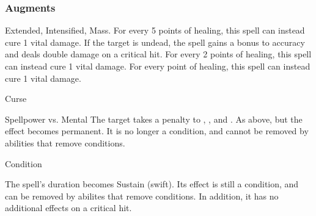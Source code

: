 \subsubsection{Augments}
 Extended, Intensified, Mass.
For every 5 points of healing, this spell can instead cure 1 vital damage.
If the target is undead, the spell gains a  bonus to accuracy and deals double damage on a critical hit.
For every 2 points of healing, this spell can instead cure 1 vital damage.
For every point of healing, this spell can instead cure 1 vital damage.
\begin{spellsection}{Curse}
\begin{spellheader}
\end{spellheader}
\begin{spellcontent}
\begin{spelltargetinginfo}
\end{spelltargetinginfo}
\begin{spelleffects}
\begin{spellattack}{Spellpower vs. Mental}
\spellsuccess
The target takes a  penalty to , , and .
\spellcritical
As above, but the effect becomes permanent.
It is no longer a condition, and cannot be removed by abilities that remove conditions.
\end{spellattack}
\spelldur Condition
\end{spelleffects}
\end{spellcontent}
\begin{spellfooter}
\spellnotes \cursespellnotes
\miscastexplode
\end{spellfooter}
\begin{spellcantrip}
The spell's duration becomes Sustain (swift).
Its effect is still a condition, and can be removed by abilites that remove conditions.
In addition, it has no additional effects on a critical hit.
\end{spellcantrip}
\end{spellsection}
